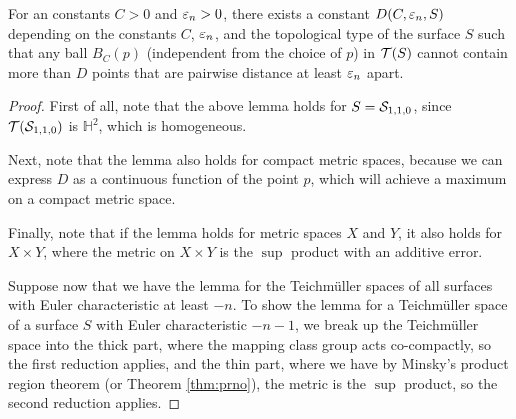 \documentclass[12pt, reqno]{amsart}
\begin{document}
\begin{lemma}
  \label{lem:packing-argument}
  For an constants $C > 0$ and $\varepsilon_n > 0$, there exists a constant $D(C, \varepsilon_n, S)$ depending on the constants $C$, $\varepsilon_n$, and the topological type of the surface $S$ such that any ball $B_C(p)$ (independent from the choice of $p$) in $\mathcal{T}(S)$ cannot contain more than $D$ points that are pairwise distance at least $\varepsilon_n$ apart.
\end{lemma}

\begin{proof}
  First of all, note that the above lemma holds for $S = \mathcal{S}_{1,1,0}$, since $\mathcal{T}(\mathcal{S}_{1,1,0})$ is $\mathbb{H}^2$, which is homogeneous.

  Next, note that the lemma also holds for compact metric spaces, because we can express $D$ as a continuous function of the point $p$, which will achieve a maximum on a compact metric space.

  Finally, note that if the lemma holds for metric spaces $X$ and $Y$, it also holds for $X \times Y$, where the metric on $X \times Y$ is the $\sup$ product with an additive error.

  Suppose now that we have the lemma for the Teichmüller spaces of all surfaces with Euler characteristic at least $-n$.
  To show the lemma for a Teichmüller space of a surface $S$ with Euler characteristic $-n-1$, we break up the Teichmüller space into the thick part, where the mapping class group acts co-compactly, so the first reduction applies, and the thin part, where we have by Minsky's product region theorem \cite[Theorem 6.1]{1077244446} (or Theorem \ref{thm:prno}), the metric is the $\sup$ product, so the second reduction applies.
\end{proof}
\end{document}
